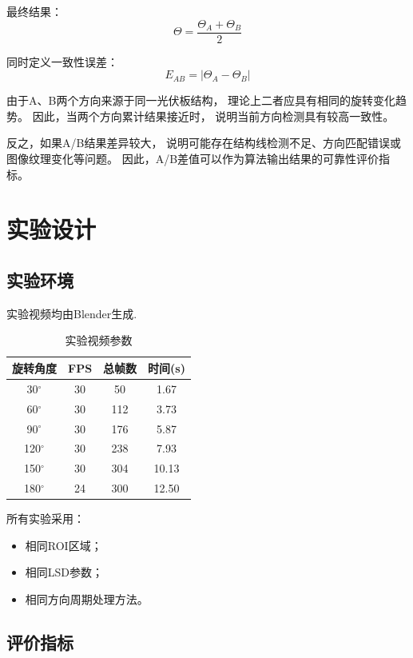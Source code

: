 \documentclass[UTF8,a4paper,12pt]{ctexart}
\begin{document}
	最终结果： 
	\begin{equation} 
		\Theta= 
		\frac{\Theta_A+\Theta_B}{2} 
	\end{equation} 
	
	同时定义一致性误差： 
	\begin{equation} 
		E_{AB} 
		= 
		|\Theta_A-\Theta_B| 
	\end{equation} 
	
	由于A、B两个方向来源于同一光伏板结构， 
	理论上二者应具有相同的旋转变化趋势。 
	因此，当两个方向累计结果接近时， 
	说明当前方向检测具有较高一致性。 
	
	反之，如果A/B结果差异较大， 
	说明可能存在结构线检测不足、方向匹配错误或图像纹理变化等问题。 
	因此，A/B差值可以作为算法输出结果的可靠性评价指标。 
	
	 
	
	\section{实验设计} 
	\subsection{实验环境} 
	实验视频均由Blender生成. 
	
	\begin{table}[!htb] 
		\centering 
		\caption{实验视频参数} 
		\begin{tabular}{cccc} 
			\toprule 
			旋转角度 & FPS & 总帧数 & 时间(s)\\ 
			\midrule 
			30$^\circ$ &30&50&1.67\\ 
			60$^\circ$ &30&112&3.73\\ 
			90$^\circ$ &30&176&5.87\\ 
			120$^\circ$&30&238&7.93\\ 
			150$^\circ$&30&304&10.13\\ 
			180$^\circ$&24&300&12.50\\ 
			\bottomrule 
		\end{tabular} 
	\end{table} 
	
	所有实验采用： 
	\begin{itemize} 
		\item 相同ROI区域； 
		\item 相同LSD参数； 
		\item 相同方向周期处理方法。 
	\end{itemize} 
	
	\subsection{评价指标} 
	
\end{document}

